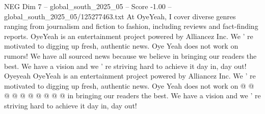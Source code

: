 \begin{textsample}{NEG Dim 7 – global\_south\_2025\_05 – Score -1.00 – global\_south\_2025\_05/125277463.txt}
At OyeYeah, I cover diverse genres ranging from journalism and fiction to fashion, including reviews and fact-finding reports.
OyeYeah is an entertainment project powered by Alliancez Inc.
We ' re motivated to digging up fresh, authentic news.
Oye Yeah does not work on rumors!
We have all sourced news because we believe in bringing our readers the best.
We have a vision and we ' re striving hard to achieve it day in, day out!
Oyeyeah OyeYeah is an entertainment project powered by Alliancez Inc.
We ' re motivated to digging up fresh, authentic news.
Oye Yeah does not work on @ @ @ @ @ @ @ @ @ @ in bringing our readers the best.
We have a vision and we ' re striving hard to achieve it day in, day out!

\end{textsample}
